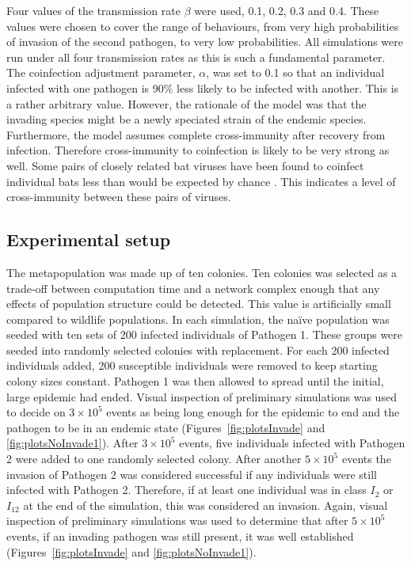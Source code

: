 Four values of the transmission rate $\beta$ were used, 0.1, 0.2, 0.3 and 0.4.
These values were chosen to cover the range of behaviours, from very high probabilities of invasion of the second pathogen, to very low probabilities.
All simulations were run under all four transmission rates as this is such a fundamental parameter.
The coinfection adjustment parameter, $\alpha$, was set to 0.1 so that an individual infected with one pathogen is 90\% less likely to be infected with another.
This is a rather arbitrary value.
However, the rationale of the model was that the invading species might be a newly speciated strain of the endemic species.
Furthermore, the model assumes complete cross-immunity after recovery from infection.
Therefore cross-immunity to coinfection is likely to be very strong as well.
Some pairs of closely related bat viruses have been found to coinfect individual bats less than would be expected by chance \cite{anthony2013strategy}.
This indicates a level of cross-immunity between these pairs of viruses. %





\subsection{Experimental setup}

The metapopulation was made up of ten colonies.
Ten colonies was selected as a trade-off between computation time and a network complex enough that any effects of population structure could be detected.
This value is artificially small compared to wildlife populations. 
In each simulation, the na{\"i}ve population was seeded with ten sets of 200 infected individuals of Pathogen 1.
These groups were seeded into randomly selected colonies with replacement.
For each 200 infected individuals added, 200 susceptible individuals were removed to keep starting colony sizes constant. 
Pathogen 1 was then allowed to spread until the initial, large epidemic had ended. 
Visual inspection of preliminary simulations was used to decide on \ensuremath{3\times 10^{5}} events as being long enough for the epidemic to end and the pathogen to be in an endemic state (Figures~\ref{fig:plotsInvade} and \ref{fig:plotsNoInvade1}).
After \ensuremath{3\times 10^{5}} events, five individuals infected with Pathogen 2 were added to one randomly selected colony. 
After another \ensuremath{5\times 10^{5}} events the invasion of Pathogen 2 was considered successful if any individuals were still infected with Pathogen 2.
Therefore, if at least one individual was in class $I_2$ or $I_{12}$ at the end of the simulation, this was considered an invasion.
Again, visual inspection of preliminary simulations was used to determine that after \ensuremath{5\times 10^{5}} events, if an invading pathogen was still present, it was well established (Figures~\ref{fig:plotsInvade} and \ref{fig:plotsNoInvade1}).

